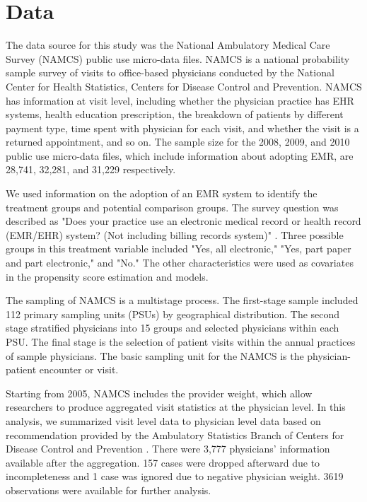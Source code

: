 \documentclass[12pt]{report}
\begin{document}
\section{Data}
The data source for this study was the National Ambulatory Medical Care Survey (NAMCS) public use micro-data files. NAMCS is a national probability sample survey of visits to office-based physicians conducted by the National Center for Health Statistics, Centers for Disease Control and Prevention. NAMCS has information at visit level, including whether the physician practice has EHR systems, health education prescription, the breakdown of patients by different payment type, time spent with physician for each visit, and whether the visit is a returned appointment, and so on. The sample size for the 2008, 2009, and 2010 public use micro-data files, which include information about adopting EMR, are 28,741, 32,281, and 31,229 respectively.

We used information on the adoption of an EMR system to identify the treatment groups and potential comparison groups. The survey question was described as "Does your practice use an electronic medical record or health record (EMR/EHR) system? (Not including billing records system)" \citep{NAMCSDOC2010}. Three possible groups in this treatment variable included "Yes, all electronic," "Yes, part paper and part electronic," and "No." The other characteristics were used as covariates in the propensity score estimation and models.

The sampling of NAMCS is a multistage process. The first-stage sample included 112 primary sampling units (PSUs) by geographical distribution. The second stage stratified physicians into 15 groups and selected physicians within each PSU. The final stage is the selection of patient visits within the annual practices of sample physicians. The basic sampling unit for the NAMCS is the physician-patient encounter or visit. 

Starting from 2005, NAMCS includes the provider weight, which allow researchers to produce aggregated visit statistics at the physician level. In this analysis, we summarized visit level data to physician level data based on recommendation provided by the Ambulatory Statistics Branch of Centers for Disease Control and Prevention \citep{SasProcedure}. There were 3,777 physicians' information available after the aggregation. 157 cases were dropped afterward due to incompleteness and 1 case was ignored due to negative physician weight. 3619 observations were available for further analysis. 
\end{document}
